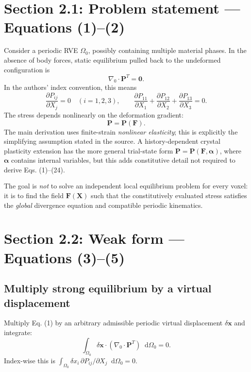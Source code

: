 \documentclass[11pt,a4paper]{article}
\numberwithin{equation}{section}
\newcommand{\F}{\mathbf F}
\newcommand{\Pstress}{\mathbf P}
\newcommand{\xvec}{\mathbf x}
\newcommand{\Xvec}{\mathbf X}
\newcommand{\zero}{\mathbf0}
\newcommand{\diff}{\mathop{}\!\mathrm d}
\newcommand{\paper}[1]{\tag{#1}}
\begin{document}
\section{Section 2.1: Problem statement --- Equations (1)--(2)}
Consider a periodic RVE $\Omega_0$, possibly containing multiple material phases. In the absence of body forces, static equilibrium pulled back to the undeformed configuration is
\begin{equation}\nabla_0\cdot\Pstress^T=\zero.\paper{1}\label{p1}\end{equation}
In the authors' index convention, this means
\[
\frac{\partial P_{ij}}{\partial X_j}=0\quad(i=1,2,3),\qquad
\frac{\partial P_{11}}{\partial X_1}+\frac{\partial P_{12}}{\partial X_2}+\frac{\partial P_{13}}{\partial X_3}=0.
\]
The stress depends nonlinearly on the deformation gradient:
\begin{equation}\Pstress=\Pstress(\F).\paper{2}\label{p2}\end{equation}
The main derivation uses finite-strain \emph{nonlinear elasticity}; this is explicitly the simplifying assumption stated in the source. A history-dependent crystal plasticity extension has the more general trial-state form $\Pstress=\Pstress(\F,\bm\alpha)$, where $\bm\alpha$ contains internal variables, but this adds constitutive detail not required to derive Eqs. (1)--(24).

\begin{insight}
The goal is \emph{not} to solve an independent local equilibrium problem for every voxel: it is to find the field $\F(\Xvec)$ such that the constitutively evaluated stress satisfies the \emph{global} divergence equation and compatible periodic kinematics.
\end{insight}

\section{Section 2.2: Weak form --- Equations (3)--(5)}
\subsection{Multiply strong equilibrium by a virtual displacement}
Multiply Eq. (1) by an arbitrary admissible periodic virtual displacement $\delta\xvec$ and integrate:
\begin{equation}
\int_{\Omega_0}\delta\xvec\cdot(\nabla_0\cdot\Pstress^T)\diff\Omega_0=0.
\paper{3}\label{p3}\end{equation}
Index-wise this is $\int_{\Omega_0}\delta x_i\,\partial P_{ij}/\partial X_j\diff\Omega_0=0$.
\end{document}

